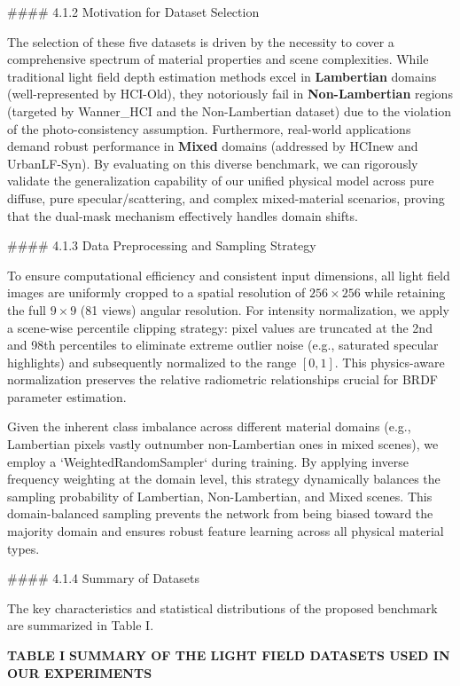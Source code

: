 \#\#\#\# 4.1.2 Motivation for Dataset Selection

The selection of these five datasets is driven by the necessity to cover a comprehensive spectrum of material properties and scene complexities. While traditional light field depth estimation methods excel in \textbf{Lambertian} domains (well-represented by HCI-Old), they notoriously fail in \textbf{Non-Lambertian} regions (targeted by Wanner_HCI and the Non-Lambertian dataset) due to the violation of the photo-consistency assumption. Furthermore, real-world applications demand robust performance in \textbf{Mixed} domains (addressed by HCInew and UrbanLF-Syn). By evaluating on this diverse benchmark, we can rigorously validate the generalization capability of our unified physical model across pure diffuse, pure specular/scattering, and complex mixed-material scenarios, proving that the dual-mask mechanism effectively handles domain shifts.

\#\#\#\# 4.1.3 Data Preprocessing and Sampling Strategy

To ensure computational efficiency and consistent input dimensions, all light field images are uniformly cropped to a spatial resolution of \(256 \times 256\) while retaining the full \(9 \times 9\) (81 views) angular resolution. For intensity normalization, we apply a scene-wise percentile clipping strategy: pixel values are truncated at the 2nd and 98th percentiles to eliminate extreme outlier noise (e.g., saturated specular highlights) and subsequently normalized to the range \([0, 1]\). This physics-aware normalization preserves the relative radiometric relationships crucial for BRDF parameter estimation.

Given the inherent class imbalance across different material domains (e.g., Lambertian pixels vastly outnumber non-Lambertian ones in mixed scenes), we employ a `WeightedRandomSampler` during training. By applying inverse frequency weighting at the domain level, this strategy dynamically balances the sampling probability of Lambertian, Non-Lambertian, and Mixed scenes. This domain-balanced sampling prevents the network from being biased toward the majority domain and ensures robust feature learning across all physical material types.

\#\#\#\# 4.1.4 Summary of Datasets

The key characteristics and statistical distributions of the proposed benchmark are summarized in Table I.

\textbf{TABLE I}
\textbf{SUMMARY OF THE LIGHT FIELD DATASETS USED IN OUR EXPERIMENTS}

